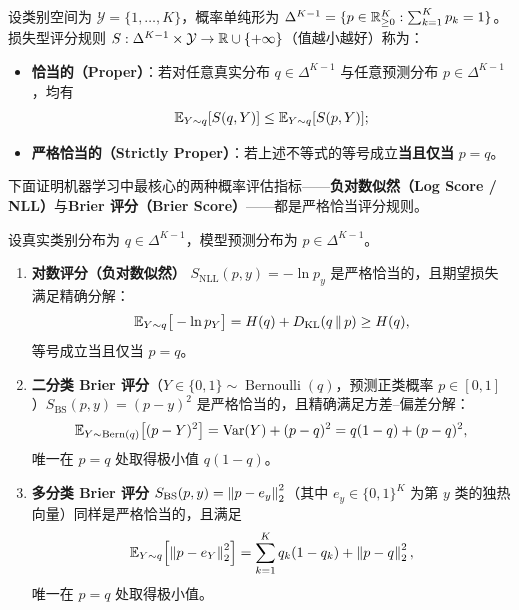 \begin{defBox}
\begin{definition}[恰当评分规则与严格恰当评分规则]\label{def:proper-scoring}
设类别空间为 $\mathcal{Y} = \{1,\dots,K\}$，概率单纯形为 $\Delta^{K-1} = \{p \in \mathbb{R}_{\ge 0}^K : \sum_{k=1}^K p_k = 1\}$。损失型评分规则 $S: \Delta^{K-1} \times \mathcal{Y} \to \mathbb{R} \cup \{+\infty\}$（值越小越好）称为：
\begin{itemize}
  \item \textbf{恰当的（Proper）}：若对任意真实分布 $q \in \Delta^{K-1}$ 与任意预测分布 $p \in \Delta^{K-1}$，均有
  \[
    \mathbb{E}_{Y \sim q}[S(q, Y)] \le \mathbb{E}_{Y \sim q}[S(p, Y)];
  \]
  \item \textbf{严格恰当的（Strictly Proper）}：若上述不等式的等号成立\textbf{当且仅当} $p = q$。
\end{itemize}
\end{definition}
\end{defBox}

下面证明机器学习中最核心的两种概率评估指标——\textbf{负对数似然（Log Score / NLL）}与\textbf{Brier 评分（Brier Score）}——都是严格恰当评分规则。

\begin{thmBox}
\begin{theorem}\label{thm:proper-rules}
设真实类别分布为 $q \in \Delta^{K-1}$，模型预测分布为 $p \in \Delta^{K-1}$。
\begin{enumerate}
  \item \textbf{对数评分（负对数似然）} $S_{\mathrm{NLL}}(p, y) = -\ln p_y$ 是严格恰当的，且期望损失满足精确分解：
  \begin{equation}\label{eq:nll-decomp}
    \mathbb{E}_{Y \sim q}\big[-\ln p_Y\big] = H(q) + D_{\mathrm{KL}}(q \,\|\, p) \ge H(q),
  \end{equation}
  等号成立当且仅当 $p = q$。
  \item \textbf{二分类 Brier 评分}（$Y \in \{0,1\} \sim \operatorname{Bernoulli}(q)$，预测正类概率 $p \in [0,1]$）$S_{\mathrm{BS}}(p, y) = (p - y)^2$ 是严格恰当的，且精确满足方差--偏差分解：
  \begin{equation}\label{eq:brier-binary}
    \mathbb{E}_{Y \sim \operatorname{Bern}(q)}\big[(p - Y)^2\big] = \operatorname{Var}(Y) + (p - q)^2 = q(1-q) + (p - q)^2,
  \end{equation}
  唯一在 $p = q$ 处取得极小值 $q(1-q)$。
  \item \textbf{多分类 Brier 评分} $S_{\mathrm{BS}}(p, y) = \left\|p - e_y\right\|_2^2$（其中 $e_y \in \{0,1\}^K$ 为第 $y$ 类的独热向量）同样是严格恰当的，且满足
  \begin{equation}\label{eq:brier-multi}
    \mathbb{E}_{Y \sim q}\!\left[\left\|p - e_Y\right\|_2^2\right] = \sum_{k=1}^K q_k(1-q_k) + \left\|p - q\right\|_2^2,
  \end{equation}
  唯一在 $p = q$ 处取得极小值。
\end{enumerate}
\end{theorem}
\end{thmBox}

